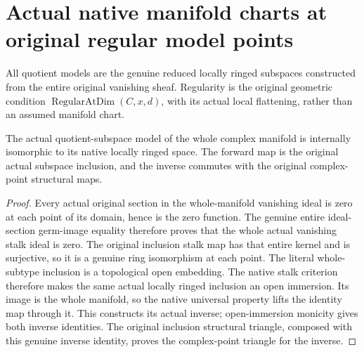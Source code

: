 \section{Actual native manifold charts at original regular model points}

All quotient models are the genuine reduced locally ringed subspaces
constructed from the entire original vanishing sheaf. Regularity is the
original geometric condition $\operatorname{RegularAtDim}(C,x,d)$, with
its actual local flattening, rather than an assumed manifold chart.

\begin{theorem}
\label{hir:actual-analytic-subspace-univ-native-manifold}
\leanok
The actual quotient-subspace model of the whole complex manifold is
internally isomorphic to its native locally ringed space. The forward
map is the original actual subspace inclusion, and the inverse commutes
with the original complex-point structural maps.
\end{theorem}
\begin{proof}
Every actual original section in the whole-manifold vanishing ideal
is zero at each point of its domain, hence is the zero function.
The genuine entire ideal-section germ-image equality therefore proves
that the whole actual vanishing stalk ideal is zero. The original
inclusion stalk map has that entire kernel and is surjective, so it is
a genuine ring isomorphism at each point. The literal whole-subtype
inclusion is a topological open embedding. The native stalk criterion
therefore makes the same actual locally ringed inclusion an open
immersion. Its image is the whole manifold, so the native universal
property lifts the identity map through it. This constructs its actual
inverse; open-immersion monicity gives both inverse identities. The
original inclusion structural triangle, composed with this genuine
inverse identity, proves the complex-point triangle for the inverse.
\end{proof}

